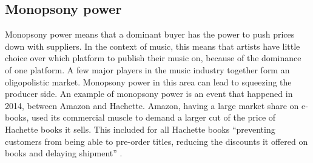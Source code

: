 \subsection{Monopsony power}
Monopsony power means that a dominant buyer has the power to push prices down with suppliers. In the context of music, this means that artists have little choice over which platform to publish their music on, because of the dominance of one platform. A few major players in the music industry together form an oligopolistic market. Monopsony power in this area can lead to squeezing the producer side. 
An example of monopsony power is an event that happened in 2014, between Amazon and Hachette. Amazon, having a large market share on e-books, used its commercial muscle to demand a larger cut of the price of Hachette books it sells. This included for all Hachette books ``preventing customers from being able to pre-order titles, reducing the discounts it offered on books and delaying shipment'' \citep{theguardian2014amazon}. 


